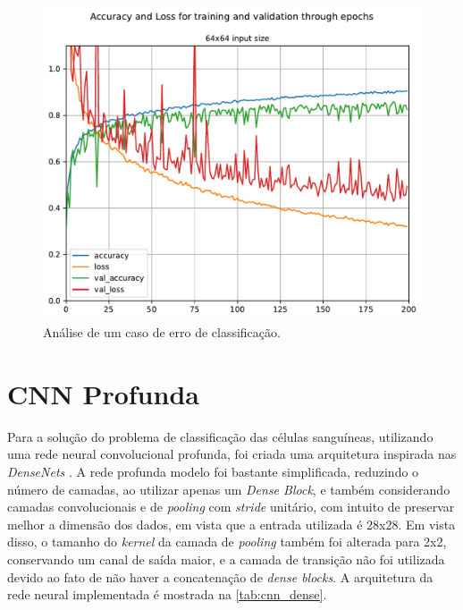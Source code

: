\begin{figure}[H]
	\centering
	\includegraphics[width=0.75\linewidth]{../../plot/cnn_shallow/64x64_model_training}
	\caption{Análise de um caso de erro de classificação.}
	\label{fig:64x64_model_training}
\end{figure}


\clearpage
\section{CNN Profunda}

Para a solução do problema de classificação das células sanguíneas, utilizando uma rede neural convolucional profunda, foi criada uma arquitetura inspirada nas \textit{DenseNets} \cite{huang2018densely}. A rede profunda modelo foi bastante simplificada, reduzindo o número de camadas, ao utilizar apenas um \textit{Dense Block}, e também considerando camadas convolucionais e de \textit{pooling} com \textit{stride} unitário, com intuito de preservar melhor a dimensão dos dados, em vista que a entrada utilizada é 28x28. Em vista disso, o tamanho do \textit{kernel} da camada de \textit{pooling} também foi alterada para 2x2, conservando um canal de saída maior, e a camada de transição não foi utilizada devido ao fato de não haver a concatenação de \textit{dense blocks}. A arquitetura da rede neural implementada é mostrada na \autoref{tab:cnn_dense}.

